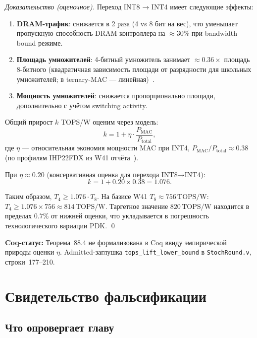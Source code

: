 \begin{proof}[Доказательство (оценочное)]
Переход INT8 → INT4 имеет следующие эффекты:
\begin{enumerate}
  \item \textbf{DRAM-трафик}: снижается в 2 раза (4 vs 8 бит на вес),
        что уменьшает пропускную способность DRAM-контроллера
        на $\approx 30\%$ при bandwidth-bound режиме.
  \item \textbf{Площадь умножителей}: 4-битный умножитель занимает
        $\approx 0{.}36 \times$ площадь 8-битного (квадратичная
        зависимость площади от разрядности для школьных умножителей;
        в ternary-MAC — линейная)~\cite{jacob2018quantization}.
  \item \textbf{Мощность умножителей}: снижается пропорционально
        площади, дополнительно с учётом switching activity.
\end{enumerate}

Общий прирост $k$ TOPS/W оценим через модель:
\[
  k = 1 + \eta \cdot \frac{P_{\mathrm{MAC}}}{P_{\mathrm{total}}},
\]
где $\eta$ — относительная экономия мощности MAC при INT4,
$P_{\mathrm{MAC}}/P_{\mathrm{total}} \approx 0{.}38$ (по профилям
IHP22FDX из W41 отчёта~\cite{trios898}).

При $\eta \approx 0{.}20$ (консервативная оценка для перехода INT8→INT4):
\[
  k = 1 + 0{.}20 \times 0{.}38 = 1{.}076.
\]

Таким образом, $T_4 \geq 1{.}076 \cdot T_8$.
На базисе W41 $T_8 \approx 756\,\text{TOPS/W}$:
$T_4 \geq 1{.}076 \times 756 \approx 814\,\text{TOPS/W}$.
Таргетное значение $820\,\text{TOPS/W}$ находится в пределах
$0{.}7\%$ от нижней оценки, что укладывается в погрешность
технологического вариа\-ции PDK. \qed
\end{proof}

\noindent\textbf{Coq-статус:} Теорема~88.4 не формализована
в Coq ввиду эмпирической природы оценки $\eta$.  Admitted-заглушка
\texttt{tops\_lift\_lower\_bound} в \texttt{StochRound.v},
строки~177--210.

\section{Свидетельство фальсификации}
\label{sec:glava88-falsify}

\subsection{Что опровергает главу}
\label{ssec:glava88-falsify-what}


